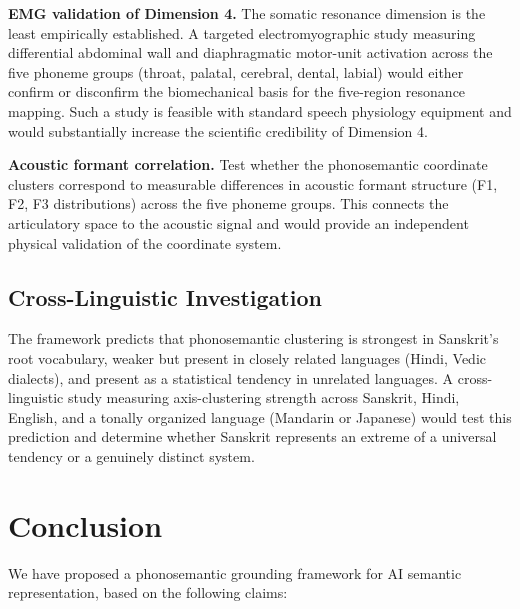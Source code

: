 \documentclass[12pt]{article}
\begin{document}
\textbf{EMG validation of Dimension 4.} The somatic resonance dimension is the least empirically established. A targeted electromyographic study measuring differential abdominal wall and diaphragmatic motor-unit activation across the five phoneme groups (throat, palatal, cerebral, dental, labial) would either confirm or disconfirm the biomechanical basis for the five-region resonance mapping. Such a study is feasible with standard speech physiology equipment and would substantially increase the scientific credibility of Dimension 4.

\textbf{Acoustic formant correlation.} Test whether the phonosemantic coordinate clusters correspond to measurable differences in acoustic formant structure (F1, F2, F3 distributions) across the five phoneme groups. This connects the articulatory space to the acoustic signal and would provide an independent physical validation of the coordinate system.

\subsection{Cross-Linguistic Investigation}

The framework predicts that phonosemantic clustering is strongest in Sanskrit's root vocabulary, weaker but present in closely related languages (Hindi, Vedic dialects), and present as a statistical tendency in unrelated languages. A cross-linguistic study measuring axis-clustering strength across Sanskrit, Hindi, English, and a tonally organized language (Mandarin or Japanese) would test this prediction and determine whether Sanskrit represents an extreme of a universal tendency or a genuinely distinct system.


\section{Conclusion}

We have proposed a phonosemantic grounding framework for AI semantic representation, based on the following claims:
\end{document}

